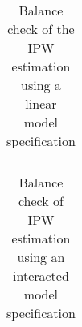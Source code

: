 \begin{table}
	\begin{tabular}{lcccc}
		 \hline \hline
	
	 \hline \hline
	\end{tabular}
	\caption{Balance check of the IPW estimation using a linear model specification}
	\label{bal_type_aipw}
\end{table}

\begin{table}
	\begin{tabular}{lcccc}
		 \hline \hline
		
		 \hline \hline
	\end{tabular}
	\caption{Balance check of IPW estimation using an interacted model specification} 
	\label{bal_type_ipw}
\end{table}